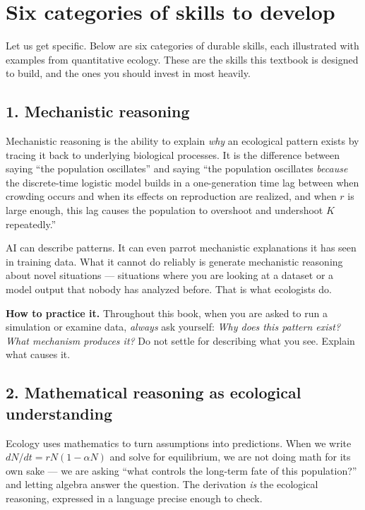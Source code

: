\documentclass[
  letterpaper,
  DIV=11,
  numbers=noendperiod]{scrreprt}
\begin{document}
\section{Six categories of skills to
develop}\label{six-categories-of-skills-to-develop}

Let us get specific. Below are six categories of durable skills, each
illustrated with examples from quantitative ecology. These are the
skills this textbook is designed to build, and the ones you should
invest in most heavily.

\subsection{1. Mechanistic reasoning}\label{mechanistic-reasoning}

Mechanistic reasoning is the ability to explain \emph{why} an ecological
pattern exists by tracing it back to underlying biological processes. It
is the difference between saying ``the population oscillates'' and
saying ``the population oscillates \emph{because} the discrete-time
logistic model builds in a one-generation time lag between when crowding
occurs and when its effects on reproduction are realized, and when \(r\)
is large enough, this lag causes the population to overshoot and
undershoot \(K\) repeatedly.''

AI can describe patterns. It can even parrot mechanistic explanations it
has seen in training data. What it cannot do reliably is generate
mechanistic reasoning about novel situations --- situations where you
are looking at a dataset or a model output that nobody has analyzed
before. That is what ecologists do.

\textbf{How to practice it.} Throughout this book, when you are asked to
run a simulation or examine data, \emph{always} ask yourself: \emph{Why
does this pattern exist? What mechanism produces it?} Do not settle for
describing what you see. Explain what causes it.

\subsection{2. Mathematical reasoning as ecological
understanding}\label{mathematical-reasoning-as-ecological-understanding}

Ecology uses mathematics to turn assumptions into predictions. When we
write \(dN/dt = rN(1 - \alpha N)\) and solve for equilibrium, we are not
doing math for its own sake --- we are asking ``what controls the
long-term fate of this population?'' and letting algebra answer the
question. The derivation \emph{is} the ecological reasoning, expressed
in a language precise enough to check.
\end{document}
